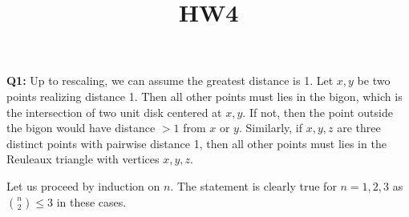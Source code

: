 \documentclass[12pt,reqno]{amsart}
\theoremstyle{definition}
\begin{document}
\title{HW4}

\noindent \textbf{Q1:} Up to rescaling, we can assume the greatest distance is 1. Let $x,y$ be two points realizing distance 1. Then all other points must lies in the bigon, which is the intersection of two unit disk centered at $x,y$. If not, then the point outside the bigon would have distance $>1$ from $x$ or $y$. Similarly,  if $x,y,z$ are three distinct points with pairwise distance 1, then all other points must lies in the Reuleaux triangle with vertices $x,y,z$.

\begin{center}
\end{center}


Let us proceed by induction on $n$. The statement is clearly true for $n=1,2,3$ as $\binom{n}{2}\leq 3$ in these cases.


\end{document}
